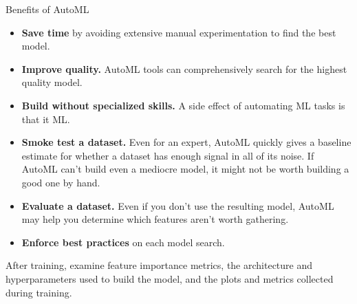 \begin{frame}{Benefits of AutoML}
  \begin{withmargin}
    \begin{tdmain}
      \footnotesize
      \begin{itemize}
        \item \textbf{Save time} by avoiding extensive manual experimentation to
          find the best model.
        \item \textbf{Improve quality.} AutoML tools can comprehensively search
          for the highest quality model.
        \item \textbf{Build without specialized skills.} A side effect of
          automating ML tasks is that it  ML.
        \item \textbf{Smoke test a dataset.} Even for an expert, AutoML quickly
          gives a baseline estimate for whether a dataset has enough signal in
          all of its noise. If AutoML can't build even a mediocre model, it
          might not be worth building a good one by hand.
        \item \textbf{Evaluate a dataset.} Even if you don't use the resulting
          model, AutoML may help you determine which features aren't worth
          gathering.
        \item \textbf{Enforce best practices} on each model search.
      \end{itemize}
    \end{tdmain}
    \begin{tdmargin}
      \vfill
      After training, examine feature importance metrics, the architecture and
      hyperparameters used to build the model, and the plots and metrics
      collected during training.
      \vfill
    \end{tdmargin}
  \end{withmargin}
\end{frame}

